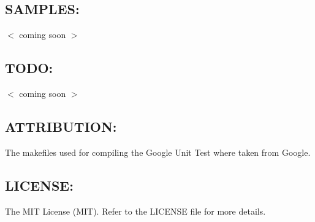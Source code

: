 \subsection*{S\+A\+M\+P\+L\+E\+S\+:}

$<$ coming soon $>$

\subsection*{T\+O\+D\+O\+:}

$<$ coming soon $>$

\subsection*{A\+T\+T\+R\+I\+B\+U\+T\+I\+O\+N\+:}


\begin{DoxyItemize}
\item The makefiles used for compiling the Google Unit Test where taken from Google.
\end{DoxyItemize}

\subsection*{L\+I\+C\+E\+N\+S\+E\+:}


\begin{DoxyItemize}
\item The M\+I\+T License (M\+I\+T). Refer to the L\+I\+C\+E\+N\+S\+E file for more details. 
\end{DoxyItemize}
